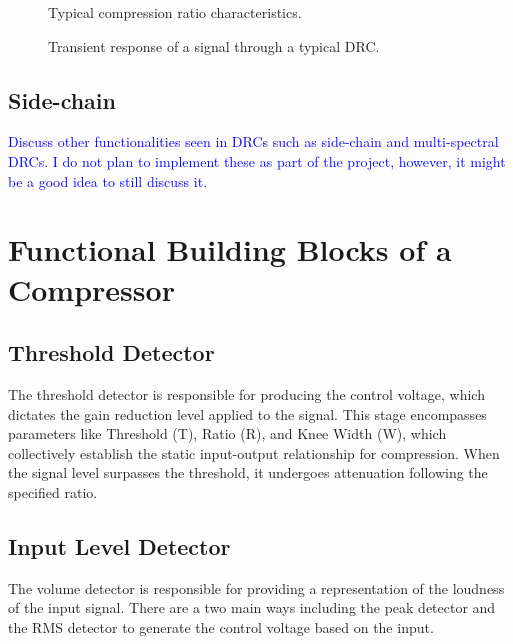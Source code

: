 \documentclass[10pt]{article}
\begin{document}
\begin{multicols*}{2}
            \begin{figure*}[ht]
                \centering
                \begin{minipage}{0.5\linewidth}
                    \centering
                    
                    \caption{Typical compression ratio characteristics.}
                    \label{fig:comp-ratio}
                \end{minipage}\hfill
                \begin{minipage}{0.5\linewidth}
                    \centering
                    
                    \caption{Transient response of a signal through a typical DRC.}
                    \label{fig:comp-trans}
                \end{minipage}\hfill
            \end{figure*}

            \subsection{Side-chain}
                \textcolor{blue}{Discuss other functionalities seen in DRCs such as side-chain and multi-spectral DRCs. I do not plan to implement these as part of the project, however, it might be a good idea to still discuss it.}

        \section{Functional Building Blocks of a Compressor}

            \subsection{Threshold Detector}
                The threshold detector is responsible for producing the control voltage, which dictates the gain reduction level applied to the signal. This stage encompasses parameters like Threshold (T), Ratio (R), and Knee Width (W), which collectively establish the static input-output relationship for compression. When the signal level surpasses the threshold, it undergoes attenuation following the specified ratio.
            
            \subsection{Input Level Detector}
                The volume detector is responsible for providing a representation of the loudness of the input signal. There are a two main ways including the peak detector and the RMS detector to generate the control voltage based on the input.


\end{multicols*}
\end{document}
